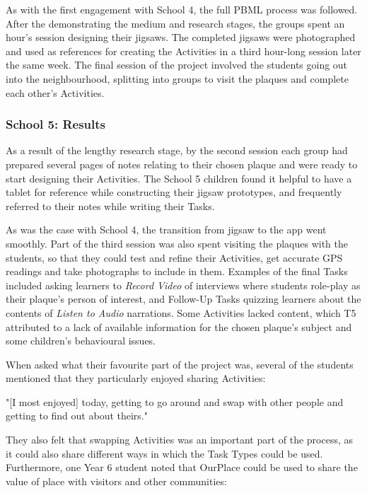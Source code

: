 As with the first engagement with School 4, the full PBML process was followed. After the demonstrating the medium and research stages, the groups spent an hour's session designing their jigsaws. The completed jigsaws were photographed and used as references for creating the Activities in a third hour-long session later the same week. The final session of the project involved the students going out into the neighbourhood, splitting into groups to visit the plaques and complete each other's Activities.

\subsubsection{School 5: Results}

As a result of the lengthy research stage, by the second session each group had prepared several pages of notes relating to their chosen plaque and were ready to start designing their Activities. The School 5 children found it helpful to have a tablet for reference while constructing their jigsaw prototypes, and frequently referred to their notes while writing their Tasks. 

As was the case with School 4, the transition from jigsaw to the app went smoothly. Part of the third session was also spent visiting the plaques with the students, so that they could test and refine their Activities, get accurate GPS readings and take photographs to include in them. Examples of the final Tasks included asking learners to \textit{Record Video} of interviews where students role-play as their plaque's person of interest, and Follow-Up Tasks quizzing learners about the contents of \textit{Listen to Audio} narrations. Some Activities lacked content, which T5 attributed to a lack of available information for the chosen plaque's subject and some children's behavioural issues.

When asked what their favourite part of the project was, several of the students mentioned that they particularly enjoyed sharing Activities: 

\begin{displayquote}
"[I most enjoyed] today, getting to go around and swap with other people and getting to find out about theirs."
\end{displayquote}

They also felt that swapping Activities was an important part of the process, as it could also share different ways in which the Task Types could be used. Furthermore, one Year 6 student noted that OurPlace could be used to share the value of place with visitors and other communities: 


